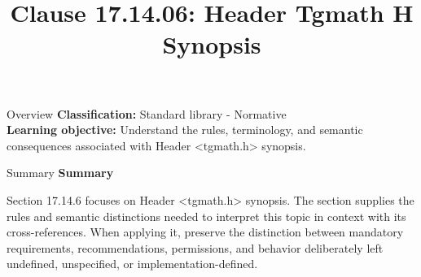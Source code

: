 \documentclass[10pt,letterpaper]{article}
\title{Clause 17.14.06: Header Tgmath H Synopsis}
\author{}
\date{}
\begin{document}
\maketitle
\begin{CornellOverviewBox}{Overview}
\textbf{Classification:} Standard library - Normative\\[2pt]
\textbf{Learning objective:} Understand the rules, terminology, and semantic consequences associated with Header <tgmath.h> synopsis.
\end{CornellOverviewBox}\begin{CornellSummaryBox}{Summary}
{\sffamily\bfseries\color{Accent} Summary}\par\vspace{3pt}Section 17.14.6 focuses on Header <tgmath.h> synopsis. The section supplies the rules and semantic distinctions needed to interpret this topic in context with its cross-references. When applying it, preserve the distinction between mandatory requirements, recommendations, permissions, and behavior deliberately left undefined, unspecified, or implementation-defined.
\end{CornellSummaryBox}
\end{document}
